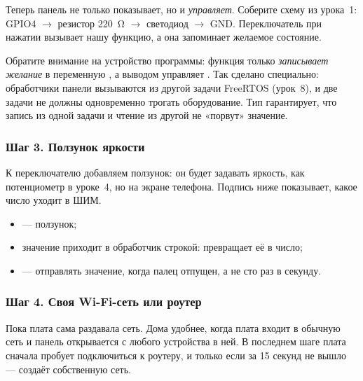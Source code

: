 Теперь панель не только показывает, но и \emph{управляет}. Соберите схему из урока~1: GPIO4 $\to$ резистор
\SI{220}{\ohm} $\to$ светодиод $\to$ GND. Переключатель при нажатии вызывает нашу функцию, а она запоминает
желаемое состояние.


Обратите внимание на устройство программы: функция  только \emph{записывает желание}
в переменную , а выводом управляет . Так сделано специально: обработчики панели
вызываются из другой задачи FreeRTOS (урок~8), и две задачи не должны одновременно трогать оборудование.
Тип  гарантирует, что запись из одной задачи и чтение из другой не «порвут» значение.

\subsubsection{Шаг 3. Ползунок яркости}

К переключателю добавляем ползунок: он будет задавать яркость, как потенциометр в уроке~4, но на экране
телефона. Подпись ниже показывает, какое число уходит в ШИМ.


\begin{itemize}[leftmargin=*]
  \item {} --- ползунок;
  \item значение приходит в обработчик строкой:  превращает её в число;
  \item {} --- отправлять значение, когда палец отпущен, а не сто раз в секунду.
\end{itemize}

\subsubsection{Шаг 4. Своя Wi-Fi-сеть или роутер}

Пока плата сама раздавала сеть. Дома удобнее, когда плата входит в обычную сеть и панель открывается с любого
устройства в ней. В последнем шаге плата сначала пробует подключиться к роутеру, и только если за 15 секунд
не вышло --- создаёт собственную сеть.


